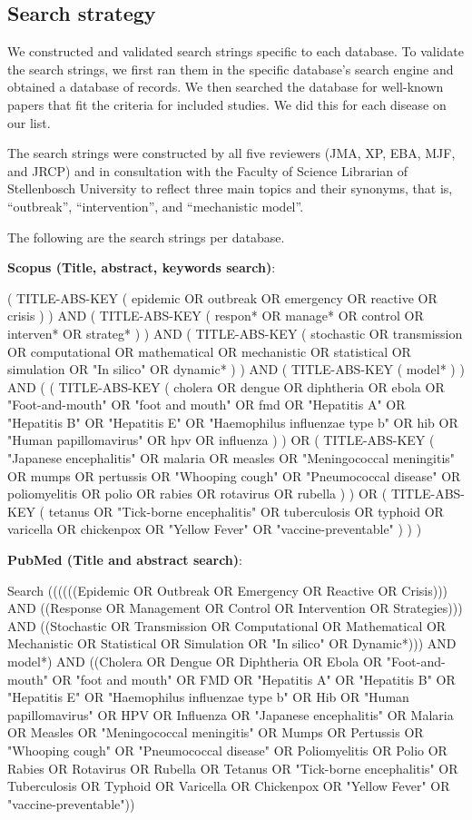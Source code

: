 \documentclass[10pt,letterpaper]{article}
\begin{document}
\subsection*{Search strategy}
We constructed and validated search strings specific to each database. To validate the search strings, we first ran them in the specific database's search engine and obtained a database of records. We then searched the database for well-known papers that fit the criteria for included studies. We did this for each disease on our list. 

The search strings were constructed by all five reviewers (JMA, XP, EBA, MJF, and JRCP) and in consultation with the Faculty of Science Librarian of Stellenbosch University to reflect three main topics and their synonyms, that is, ``outbreak'', ``intervention'', and ``mechanistic model''. 

The following are the search strings per database. 

\textbf{Scopus (Title, abstract, keywords search)}:

( TITLE-ABS-KEY ( epidemic  OR  outbreak  OR  emergency  OR  reactive  OR  crisis ) )  AND  ( TITLE-ABS-KEY ( respon*  OR  manage*  OR  control  OR  interven*  OR  strateg* ) )  AND  ( TITLE-ABS-KEY ( stochastic  OR  transmission  OR  computational  OR  mathematical  OR  mechanistic  OR  statistical  OR  simulation  OR  "In silico"  OR  dynamic* ) )  AND  ( TITLE-ABS-KEY ( model* ) )  AND  ( ( TITLE-ABS-KEY ( cholera  OR  dengue  OR  diphtheria  OR  ebola  OR  "Foot-and-mouth"  OR  "foot and mouth"  OR  fmd  OR  "Hepatitis A"  OR  "Hepatitis B"  OR  "Hepatitis E"  OR  "Haemophilus influenzae type b"  OR  hib  OR  "Human papillomavirus"  OR  hpv  OR  influenza ) )  OR  ( TITLE-ABS-KEY ( "Japanese encephalitis"  OR  malaria  OR  measles  OR  "Meningococcal meningitis"  OR  mumps  OR  pertussis  OR  "Whooping cough"  OR  "Pneumococcal disease"  OR  poliomyelitis  OR  polio  OR  rabies  OR  rotavirus  OR  rubella ) )  OR  ( TITLE-ABS-KEY ( tetanus  OR  "Tick-borne encephalitis"  OR  tuberculosis  OR  typhoid  OR  varicella  OR  chickenpox  OR  "Yellow Fever"  OR  "vaccine-preventable" ) ) )

\textbf{PubMed (Title and abstract search)}:

Search ((((((Epidemic OR Outbreak OR Emergency OR Reactive OR Crisis))) AND ((Response OR Management OR Control OR Intervention OR Strategies))) AND ((Stochastic OR Transmission OR Computational OR Mathematical OR Mechanistic OR Statistical OR Simulation OR "In silico" OR Dynamic*))) AND model*) AND ((Cholera OR Dengue OR Diphtheria OR Ebola OR "Foot-and-mouth" OR "foot and mouth" OR FMD OR "Hepatitis A" OR "Hepatitis B" OR "Hepatitis E" OR "Haemophilus influenzae type b" OR Hib OR "Human papillomavirus" OR HPV OR Influenza OR "Japanese encephalitis" OR Malaria OR Measles OR "Meningococcal meningitis" OR Mumps OR Pertussis OR "Whooping cough" OR "Pneumococcal disease" OR Poliomyelitis OR Polio OR Rabies OR Rotavirus OR Rubella OR Tetanus OR "Tick-borne encephalitis" OR Tuberculosis OR Typhoid OR Varicella OR Chickenpox OR "Yellow Fever" OR "vaccine-preventable"))
\end{document}
